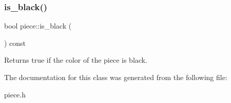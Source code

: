 \subsubsection{\texorpdfstring{is\+\_\+black()}{is\_black()}}
{\footnotesize\ttfamily bool piece\+::is\+\_\+black (\begin{DoxyParamCaption}{ }\end{DoxyParamCaption}) const\hspace{0.3cm}{\ttfamily [inline]}}

Returns true if the color of the piece is black. 

The documentation for this class was generated from the following file\+:\begin{DoxyCompactItemize}
\item 
piece.\+h\end{DoxyCompactItemize}
